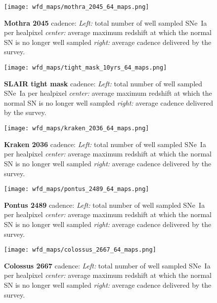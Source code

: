 \begin{figure}[!htbp]
  \begin{center}
    \texttt{[image: wfd\_maps/mothra\_2045\_64\_maps.png]}
    \caption{{\bf Mothra 2045} cadence: {\em Left:} total number of well
      sampled SNe~Ia per healpixel {\em center:} average maximum
      redshift at which the normal SN is no longer well sampled {\em
        right:} average cadence delivered by the survey.}
    \label{fig:mothra_2045}
  \end{center}
\end{figure}

  
\begin{figure}[!htbp]
  \begin{center}
    \texttt{[image: wfd\_maps/tight\_mask\_10yrs\_64\_maps.png]}
    \caption{{\bf SLAIR tight mask} cadence: {\em Left:} total number of well
      sampled SNe~Ia per healpixel {\em center:} average maximum
      redshift at which the normal SN is no longer well sampled {\em
        right:} average cadence delivered by the survey.}
    \label{fig:tight_mask}
  \end{center}
\end{figure}

\begin{figure}[!htbp]
  \begin{center}
    \texttt{[image: wfd\_maps/kraken\_2036\_64\_maps.png]}
    \caption{{\bf Kraken 2036} cadence: {\em Left:} total number of well
      sampled SNe~Ia per healpixel {\em center:} average maximum
      redshift at which the normal SN is no longer well sampled {\em
        right:} average cadence delivered by the survey.}
    \label{fig:kraken_2036}
  \end{center}
\end{figure}



  \begin{figure}[!htbp]
  \begin{center}
    \texttt{[image: wfd\_maps/pontus\_2489\_64\_maps.png]}
    \caption{{\bf Pontus 2489} cadence: {\em Left:} total number of well
      sampled SNe~Ia per healpixel {\em center:} average maximum
      redshift at which the normal SN is no longer well sampled {\em
        right:} average cadence delivered by the survey.}
    \label{fig:pontus_2489}
  \end{center}
\end{figure}

\begin{figure}[!htbp]
  \begin{center}
    \texttt{[image: wfd\_maps/colossus\_2667\_64\_maps.png]}
    \caption{{\bf Colossus 2667} cadence: {\em Left:} total number of well
      sampled SNe~Ia per healpixel {\em center:} average maximum
      redshift at which the normal SN is no longer well sampled {\em
        right:} average cadence delivered by the survey.}
  \end{center}
  \label{fig:colossus_2667}
\end{figure}

